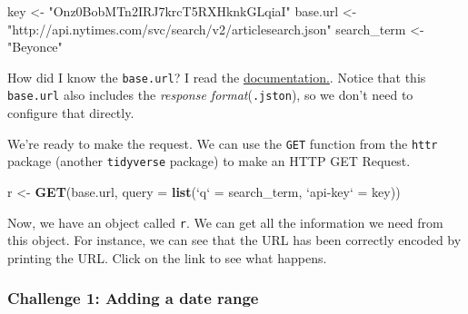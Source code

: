 \documentclass[]{book}
\newenvironment{Shaded}{\begin{snugshade}}{\end{snugshade}}
\newcommand{\KeywordTok}[1]{\textcolor[rgb]{0.13,0.29,0.53}{\textbf{#1}}}
\newcommand{\DataTypeTok}[1]{\textcolor[rgb]{0.13,0.29,0.53}{#1}}
\newcommand{\StringTok}[1]{\textcolor[rgb]{0.31,0.60,0.02}{#1}}
\newcommand{\CommentTok}[1]{\textcolor[rgb]{0.56,0.35,0.01}{\textit{#1}}}
\newcommand{\OperatorTok}[1]{\textcolor[rgb]{0.81,0.36,0.00}{\textbf{#1}}}
\newcommand{\NormalTok}[1]{#1}
\begin{document}
\begin{Shaded}
\begin{Highlighting}[]
\NormalTok{key <-}\StringTok{ "Onz0BobMTn2IRJ7krcT5RXHknkGLqiaI"}
\NormalTok{base.url <-}\StringTok{ "http://api.nytimes.com/svc/search/v2/articlesearch.json"}
\NormalTok{search_term <-}\StringTok{ "Beyonce"}
\end{Highlighting}
\end{Shaded}

How did I know the \texttt{base.url}? I read the
\href{https://developer.nytimes.com/docs/articlesearch-product/1/routes/articlesearch.json/get}{documentation.}.
Notice that this \texttt{base.url} also includes the \emph{response
format}(\texttt{.jston}), so we don't need to configure that directly.

We're ready to make the request. We can use the \texttt{GET} function
from the \texttt{httr} package (another \texttt{tidyverse} package) to
make an HTTP GET Request.

\begin{Shaded}
\begin{Highlighting}[]
\NormalTok{r <-}\StringTok{ }\KeywordTok{GET}\NormalTok{(base.url, }\DataTypeTok{query =} \KeywordTok{list}\NormalTok{(}\StringTok{`}\DataTypeTok{q}\StringTok{`}\NormalTok{ =}\StringTok{ }\NormalTok{search_term,}
                                \StringTok{`}\DataTypeTok{api-key}\StringTok{`}\NormalTok{ =}\StringTok{ }\NormalTok{key))}
\end{Highlighting}
\end{Shaded}

Now, we have an object called \texttt{r}. We can get all the information
we need from this object. For instance, we can see that the URL has been
correctly encoded by printing the URL. Click on the link to see what
happens.

\begin{Shaded}
\end{Shaded}

\subsubsection*{Challenge 1: Adding a date
range}\label{challenge-1-adding-a-date-range}
\end{document}
